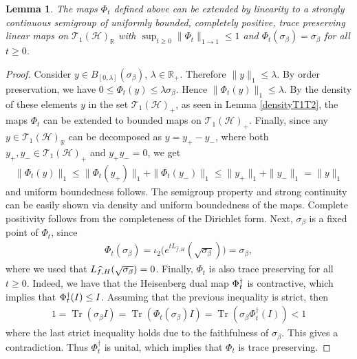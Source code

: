 \documentclass[11pt]{amsart}
\newcommand{\1}{\mathbbm{1}}
\newcommand{\Tr}{\operatorname{Tr}}
\theoremstyle{plain}
\newtheorem{lemma}[theorem]{Lemma}
\theoremstyle{definition}
\theoremstyle{remark}
\numberwithin{equation}{section}
\begin{document}
\begin{lemma}\label{T1semigroupgeneration}
The maps $\Phi_t$ defined above can be extended by linearity to a strongly continuous semigroup of uniformly bounded, completely positive, trace preserving linear maps on $\mathscr{T}_1(\mathcal{H})_{\mathbb{R}}$ with $\sup_{t\ge 0}\|\Phi_t\|_{1\to 1}\le 1$ and $\Phi_t(\sigma_\beta)=\sigma_\beta$ for all $t\ge 0$.
\end{lemma}
\begin{proof}
Consider $ y\in B_{[0,\lambda]}(\sigma_\beta)$, $\lambda\in\mathbb{R}_+$. Therefore $\|y\|_1\le \lambda$. By order preservation, we have $0\le \Phi_t(y)\le \lambda \sigma_\beta$. Hence $\|\Phi_t(y)\|_1\le \lambda$. By the density of these elements $y$ in the set $\mathscr{T}_1(\mathcal{H})_+$, as seen in Lemma \ref{densityT1T2}, the maps $\Phi_t$ can be extended to bounded maps on $\mathscr{T}_1(\mathcal{H})_+$. Finally, since any $y\in \mathscr{T}_1(\mathcal{H})_{\mathbb{R}}$ can be decomposed as $y=y_+-y_-$, where both $y_+,y_-\in\mathscr{T}_1(\mathcal{H})_+$ and $y_+y_-=0$, we get
\begin{align*}
\|\Phi_t(y)\|_1\le \|\Phi_t(y_+)\|_1+\|\Phi_t(y_-)\|_1
\le \|y_+\|_1+\|y_-\|_1
=\|y\|_1
\end{align*}
and uniform boundedness follows. The semigroup property and strong continuity can be easily shown via density and uniform boundedness of the maps. Complete positivity follows from the completeness of the Dirichlet form. Next, $\sigma_\beta$ is a fixed point of $\Phi_t$, since 
\begin{align*}
\Phi_t(\sigma_\beta)=\iota_2\Big(e^{tL_{\widehat{f},H}}(\sqrt{\sigma_\beta})\Big)=\sigma_\beta,
\end{align*}
where we used that $L_{\smash{\widehat{f},H}}(\sqrt{\sigma_\beta})=0$. Finally, $\Phi_t$ is also trace preserving for all $t\ge 0$. Indeed, we have that the Heisenberg dual map $\Phi^{\smash{\dagger}}_t$ is contractive, which implies that $\Phi^{\smash{\dagger}}_t(I)\le I$. Assuming that the previous inequality is strict, then 
\begin{align*}
1=\Tr(\sigma_\beta I)=\Tr(\Phi_t(\sigma_\beta)I)=\Tr(\sigma_\beta \Phi_t^{\dagger}(I))<1
\end{align*}
where the last strict inequality holds due to the faithfulness of $\sigma_\beta$. This gives a contradiction. Thus $\Phi_t^{\dagger}$ is unital, which implies that $\Phi_t$ is trace preserving. 
\end{proof}
\end{document}
